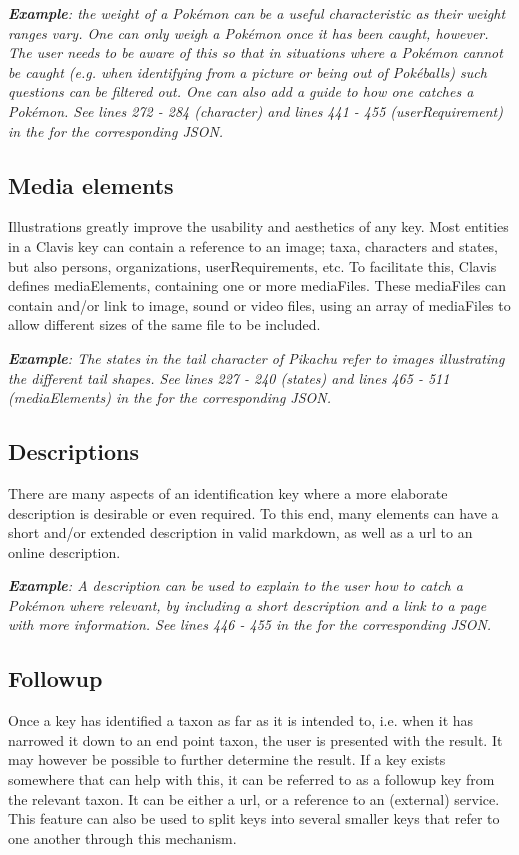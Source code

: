\documentclass[10pt,letterpaper]{article}
\begin{document}

\textit{\textbf{Example}: the weight of a Pokémon can be a useful characteristic as their weight ranges vary. One can only weigh a Pokémon once it has been caught, however. The user needs to be aware of this so that in situations where a Pokémon cannot be caught (e.g. when identifying from a picture or being out of Pokéballs) such questions can be filtered out. One can also add a guide to how one catches a Pokémon. See lines 272 - 284 (character) and lines 441 - 455 (userRequirement) in the  for the corresponding JSON.}

\subsection*{
Media elements
}
Illustrations greatly improve the usability and aesthetics of any key. Most entities in a Clavis key can contain a reference to an image; taxa, characters and states, but also persons, organizations, userRequirements, etc. To facilitate this, Clavis defines mediaElements, containing one or more mediaFiles. These mediaFiles can contain and/or link to image, sound or video files, using an array of mediaFiles to allow different sizes of the same file to be included.


\textit{\textbf{Example}: The states in the tail character of Pikachu refer to images illustrating the different tail shapes. See lines 227 - 240 (states) and lines 465 - 511 (mediaElements) in the  for the corresponding JSON.}
\subsection*{
Descriptions
}
There are many aspects of an identification key where a more elaborate description is desirable or even required. To this end, many elements can have a short and/or extended description in valid markdown, as well as a url to an online description.


\textit{\textbf{Example}: A description can be used to explain to the user how to catch a Pokémon where relevant, by including a short description and a link to a page with more information. See lines 446 - 455 in the  for the corresponding JSON.}
\subsection*{
Followup
}
Once a key has identified a taxon as far as it is intended to, i.e. when it has narrowed it down to an end point taxon, the user is presented with the result. It may however be possible to further determine the result. If a key exists somewhere that can help with this, it can be referred to as a followup key from the relevant taxon. It can be either a url, or a reference to an (external) service. This feature can also be used to split keys into several smaller keys that refer to one another through this mechanism.
\end{document}
